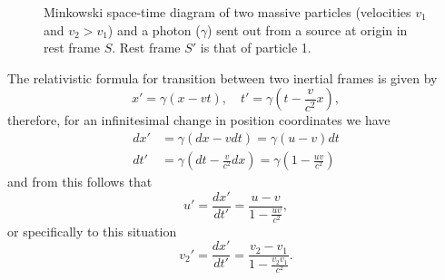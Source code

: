 \documentclass[11pt]{amsart}
\begin{document}
\begin{figure}
\centering
{}
\caption{Minkowski space-time diagram of two massive particles (velocities $v_1$ and $v_2>v_1$) and a photon ($\gamma$) sent out from a source at origin in rest frame $S$. Rest frame $S'$ is that of particle 1.}
\label{fig:minkowski1}
\end{figure}

The relativistic formula for transition between two inertial frames is given by
\begin{equation}
x' = \gamma(x-vt), \quad t' = \gamma(t-\frac{v}{c^2}x),
\end{equation}
therefore, for an infinitesimal change in position coordinates we have
\begin{align*}
dx'  &= \gamma(dx - vdt) = \gamma(u-v)dt \\
dt'  &= \gamma(dt - \frac{v}{c^2}dx) = \gamma(1 - \frac{uv}{c^2})
\end{align*}
and from this follows that
\begin{equation*}
u' = \frac{dx'}{dt'} = \frac{u-v}{1-\frac{uv}{c^2}},
\end{equation*}
or specifically to this situation
\begin{equation}
\label{eq:boostvelocitychange}
v_2' = \frac{dx'}{dt'} = \frac{v_2-v_1}{1-\frac{v_2v_1}{c^2}}.
\end{equation}
\end{document}
